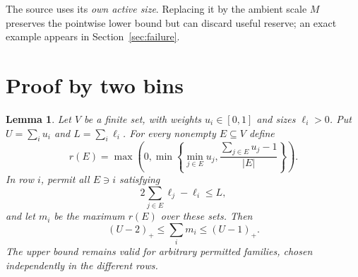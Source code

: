 \documentclass[a4paper,11pt]{article}
\newtheorem{lemma}[theorem]{Lemma}
\theoremstyle{remark}\newtheorem{remark}[theorem]{Remark}
\newcommand{\pp}[1]{\left(#1\right)_+}
\begin{document}
The source uses its \emph{own active size}. Replacing it by the ambient scale $M$ preserves the pointwise lower bound but can discard useful reserve; an exact example appears in Section~\ref{sec:failure}.

\section{Proof by two bins}
\begin{lemma}\label{lem:bins}
Let $V$ be a finite set, with weights $u_i\in[0,1]$ and sizes $\ell_i>0$. Put $U=\sum_i u_i$ and $L=\sum_i\ell_i$. For every nonempty $E\subseteq V$ define
\[
 r(E)=\max\left(0,\min\left\{\min_{j\in E}u_j,
                     \frac{\sum_{j\in E}u_j-1}{|E|}\right\}\right).
\]
In row $i$, permit all $E\ni i$ satisfying
\begin{equation}\label{eq:size}
 2\sum_{j\in E}\ell_j-\ell_i\le L,
\end{equation}
and let $m_i$ be the maximum $r(E)$ over these sets. Then
\begin{equation}\label{eq:bins}
 \pp{U-2}\le\sum_i m_i\le\pp{U-1}.
\end{equation}
The upper bound remains valid for arbitrary permitted families, chosen independently in the different rows.
\end{lemma}
\end{document}
